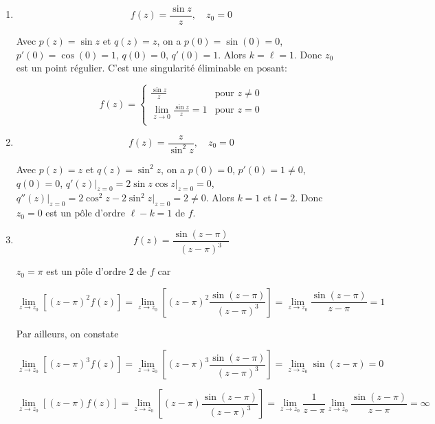 \begin{example}\hfill

    \begin{enumerate}[label=\arabic{enumi})]
        \item 
        \[ f(z) =  \frac{\sin z}{z}, \quad z_0 = 0 \]
        
        Avec $p(z) = \sin z$ et $q(z) = z$, on a $p(0) = \sin(0) = 0$, $p'(0) = \cos(0) = 1$, $q(0) = 0$, $q'(0) = 1$.
        Alors $k = \ell = 1$.
        Donc $z_0$ est un point régulier.
        C'est une singularité éliminable en posant:
        
        \[
        f(z) =
        \left\{
        \begin{array}{cc}
        \frac{\sin z}{z} & \textrm{pour } z \neq 0\\
        \lim\limits_{z \rightarrow 0} \frac{\sin z}{z} = 1 & \textrm{pour } z = 0\\
        \end{array}
        \right.
        \]
        
        \item 
        \[ f(z) =  \frac{z}{\sin^2 z}, \quad z_0 = 0 \]
        
        Avec $p(z) = z$ et $q(z) = \sin^2 z$, on a $p(0) = 0$, $p'(0) = 1 \neq 0$, $q(0) = 0$, $q'(z) \Big|_{z=0} = 2 \sin z \cos z \Big|_{z=0} = 0$, $q''(z) \Big|_{z=0} = 2\cos^2 z - 2\sin^2 z \Big|_{z=0} = 2 \neq 0$.
        Alors $k = 1$ et $l = 2$.
        Donc $z_0 = 0$ est un pôle d'ordre $\ell - k = 1$ de $f$.
        
        \item 
        \[ f(z) = \frac{\sin (z - \pi)}{(z - \pi)^3} \]
        
        $z_0 = \pi$ est un pôle d'ordre 2 de $f$ car
        
        \[ \lim\limits_{z \rightarrow z_0} \left[ (z - \pi)^2 f(z) \right]
        = \lim\limits_{z \rightarrow z_0} \left[ (z - \pi)^2 \frac{\sin (z - \pi)}{(z - \pi)^3} \right]
        = \lim\limits_{z \rightarrow z_0} \frac{\sin (z - \pi)}{z - \pi} = 1\]
        
        Par ailleurs, on constate
        
        \[ \lim\limits_{z \rightarrow z_0} \left[ (z - \pi)^3 f(z) \right]
        = \lim\limits_{z \rightarrow z_0} \left[ (z - \pi)^3 \frac{\sin (z - \pi)}{(z - \pi)^3} \right]
        = \lim\limits_{z \rightarrow z_0} \sin (z - \pi) = 0 \]
        
        \[ \lim\limits_{z \rightarrow z_0} \left[ (z - \pi) f(z) \right]
        = \lim\limits_{z \rightarrow z_0} \left[ (z - \pi) \frac{\sin (z - \pi)}{(z - \pi)^3} \right]
        = \lim\limits_{z \rightarrow z_0} \frac{1}{z - \pi} \lim\limits_{z \rightarrow z_0} \frac{\sin (z - \pi)}{z - \pi} = \infty \]
    \end{enumerate}
\end{example}


